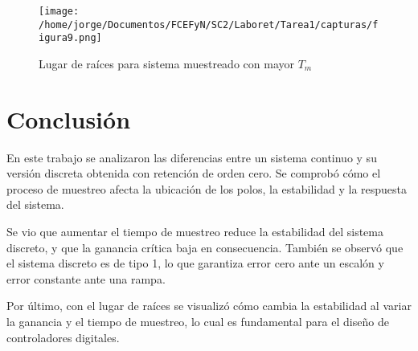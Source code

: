 \documentclass[11pt]{article}
\begin{document}
\begin{figure}[h!]
    \centering
    \texttt{[image: /home/jorge/Documentos/FCEFyN/SC2/Laboret/Tarea1/capturas/figura9.png]}
    \caption{Lugar de raíces para sistema muestreado con mayor \(T_m\)}
\end{figure}

\section*{Conclusión}

En este trabajo se analizaron las diferencias entre un sistema continuo y su versión discreta obtenida con retención de orden cero. Se comprobó cómo el proceso de muestreo afecta la ubicación de los polos, la estabilidad y la respuesta del sistema.

Se vio que aumentar el tiempo de muestreo reduce la estabilidad del sistema discreto, y que la ganancia crítica baja en consecuencia. También se observó que el sistema discreto es de tipo 1, lo que garantiza error cero ante un escalón y error constante ante una rampa.

Por último, con el lugar de raíces se visualizó cómo cambia la estabilidad al variar la ganancia y el tiempo de muestreo, lo cual es fundamental para el diseño de controladores digitales.
\end{document}
